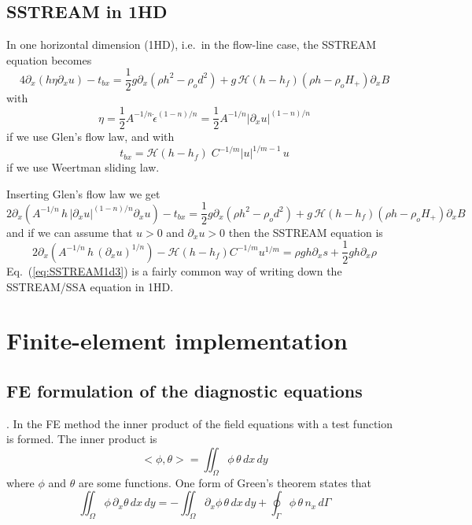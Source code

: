 \documentclass[10pt,a4paper]{book}
\newcommand{\He}{\mathcal{H}}
\newcommand{\p}{\partial}
\newcommand{\tbx}{t_{bx}}
\begin{document}
\section{SSTREAM in 1HD}

In one horizontal dimension (1HD), i.e.\ in the flow-line case, the SSTREAM equation becomes
\[
 4 \p_x ( h \eta   \p_x u ) - \tbx = \frac{1}{2} g \p_x (\rho h^2 - \rho_o d^2)+ g\,\He(h-h_f) (\rho h -\rho_o H_{+}) \p_x B 
\]
with
\[
\eta = \frac{1}{2} A^{-1/n} \dot{\epsilon}^{(1-n)/n} =  \frac{1}{2} A^{-1/n} |\p_x u|^{(1-n)/n} 
\]
if we use Glen's flow law, 
and with 
\[
t_{bx}   = \He(h-h_f) \; C^{-1/m} | u |^{1/m-1} \, u 
\]
if we use Weertman sliding law.

Inserting Glen's flow law we get
\begin{equation}
 2 \p_x ( A^{-1/n} \, h \, | \p_x u|^{(1-n)/n}   \p_x u ) - \tbx = \frac{1}{2} g \p_x (\rho h^2 - \rho_o d^2)+ g\,\He(h-h_f) (\rho h -\rho_o H_{+}) \p_x B 
\label{eq:SSTREAM1D}
\end{equation}
and if we can assume that $u>0$ and $\p_x u>0$  then the SSTREAM equation is
\begin{equation}
2 \p_x \left ( A^{-1/n} \, h \, (\p_x u)^{1/n}   \right ) - \He(h-h_f) C^{-1/m} u^{1/m} = \rho g h \p_x s + \frac{1}{2} g h \p_x \rho 
\label{eq:SSTREAM1d3}
\end{equation}
Eq.~(\ref{eq:SSTREAM1d3}) is a fairly common way of writing down the SSTREAM/SSA equation in 1HD.

\chapter{Finite-element implementation}




\section{FE formulation of the diagnostic equations}
\label{sec:nBCs}.
In the FE method the inner product of the field equations with a test function is formed. The inner product is
\[
<\phi,\theta>=\iint_{\Omega}\phi \, \theta \, dx \, dy
\] 
where $\phi$ and $\theta$ are some functions.
One form of Green's theorem states that
\[
\iint_{\Omega}\phi \, \p_x \theta \, dx \, dy=-\iint_{\Omega} \p_x\phi \, \theta \, dx\,dy +\oint_{\Gamma}\phi \, \theta \, n_x\,d\Gamma
\]
\end{document}
